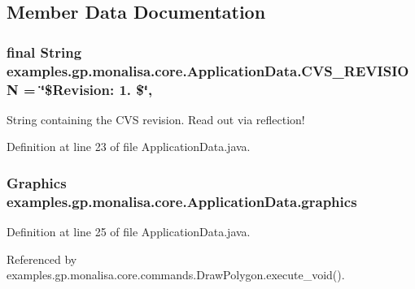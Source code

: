 \subsection{Member Data Documentation}
\hypertarget{classexamples_1_1gp_1_1monalisa_1_1core_1_1_application_data_abb2db60e0fc579d0b21f4cd492c5fec5}{
\subsubsection[{C\-V\-S\-\_\-\-R\-E\-V\-I\-S\-I\-O\-N}]{\setlength{\rightskip}{0pt plus 5cm}final String examples.\-gp.\-monalisa.\-core.\-Application\-Data.\-C\-V\-S\-\_\-\-R\-E\-V\-I\-S\-I\-O\-N = \char`\"{}\$Revision\-: 1. \$\char`\"{}\hspace{0.3cm}{\ttfamily [static]}, {\ttfamily [private]}}}\label{classexamples_1_1gp_1_1monalisa_1_1core_1_1_application_data_abb2db60e0fc579d0b21f4cd492c5fec5}
String containing the C\-V\-S revision. Read out via reflection! 

Definition at line 23 of file Application\-Data.\-java.

\hypertarget{classexamples_1_1gp_1_1monalisa_1_1core_1_1_application_data_a8103dc38fc502b0a0cff2133d9ef6589}{
\subsubsection[{graphics}]{\setlength{\rightskip}{0pt plus 5cm}Graphics examples.\-gp.\-monalisa.\-core.\-Application\-Data.\-graphics}}\label{classexamples_1_1gp_1_1monalisa_1_1core_1_1_application_data_a8103dc38fc502b0a0cff2133d9ef6589}


Definition at line 25 of file Application\-Data.\-java.



Referenced by examples.\-gp.\-monalisa.\-core.\-commands.\-Draw\-Polygon.\-execute\-\_\-void().

